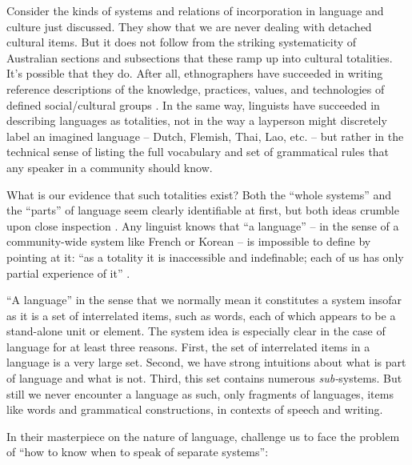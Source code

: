 Consider the kinds of systems and relations of incorporation in language and 
culture just discussed. They show that we are never dealing with 
detached cultural items. But it does not follow from the striking 
systematicity of Australian sections and subsections that 
these ramp up into cultural totalities. It's possible that they do. After all, ethnographers have 
succeeded in writing reference descriptions of the knowledge, practices, 
values, and technologies of defined social/cultural groups  \citep{radcliffe-brown_andaman_1922,bronislaw_malinowski_argonauts_1922,firth_we_1936,evans-pritchard_nuer:_1940,fortes_dynamics_1945}. In the same way, linguists have succeeded in describing languages as 
totalities, not in the way a layperson might discretely label an 
imagined language -- Dutch, Flemish, Thai, Lao, etc. -- but rather in the technical sense of listing the full vocabulary and set of 
grammatical rules that any speaker in a community should know. 



What is our evidence that such totalities exist? Both the ``whole 
systems'' and the ``parts'' of language seem clearly identifiable at first, but both ideas crumble upon close inspection \citep{le_page_acts_1985,hudson_sociolinguistics_1996}. Any linguist knows that 
``a language'' -- in the sense of a community-wide system like French or 
Korean -- is impossible to define by pointing at 
it: ``as a totality it is inaccessible and indefinable; each of us has 
only partial experience of it'' \citep[191]{le_page_acts_1985}. 



``A language'' in the sense that we normally mean it constitutes a system 
insofar as it is a set of interrelated items, such as words, each of 
which appears to be a stand-alone unit or element. The system idea is 
especially clear in the case of language for at least three reasons. First, the set of 
interrelated items in a language is a very large set. Second, we have 
strong intuitions about what is part of language and what is not. Third, this set contains numerous \textit{sub-}systems. 
But still we never encounter a language as such, only fragments of 
languages, items like words and grammatical constructions, in contexts of speech and writing. 



In their masterpiece on the nature of language, \citet[8--9]{le_page_acts_1985} challenge us to face the problem of ``how to 
know when to speak of separate systems'': 



